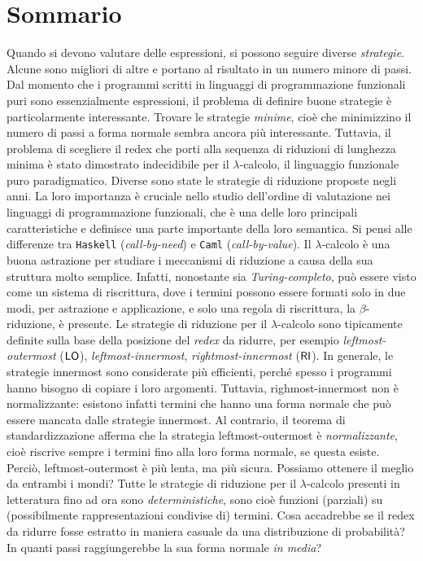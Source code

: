 \chapter*{Sommario}
Quando si devono valutare delle espressioni, si possono seguire diverse \emph{strategie}.
Alcune sono migliori di altre e portano al risultato in un numero
minore di passi. Dal momento che i programmi scritti in linguaggi di
programmazione funzionali puri sono essenzialmente espressioni, il problema
di definire buone strategie è particolarmente interessante. Trovare le
strategie \emph{minime}, cioè che minimizzino il numero di passi a forma
normale sembra ancora più interessante. Tuttavia, il problema di scegliere il
redex che porti alla sequenza di riduzioni di lunghezza minima è stato dimostrato
indecidibile per il $\lambda$-calcolo, il
linguaggio funzionale puro paradigmatico. Diverse sono state le strategie di riduzione proposte
negli anni. La loro importanza è cruciale nello studio dell'ordine di valutazione
nei linguaggi di programmazione funzionali, che è una delle loro principali
caratteristiche e definisce una parte importante della loro semantica.
Si pensi alle differenze tra
\texttt{Haskell} (\emph{call-by-need}) e \texttt{Caml}
(\emph{call-by-value}). Il $\lambda$-calcolo è una buona astrazione per
studiare i meccanismi di riduzione a causa della sua struttura molto
semplice. Infatti, nonostante sia \emph{Turing-completo}, può essere visto
come un sistema di riscrittura, dove i termini
possono essere formati solo in due modi, per astrazione e applicazione, e
solo una regola di riscrittura, la $\beta$-riduzione, è presente. Le strategie
di riduzione per il $\lambda$-calcolo sono tipicamente definite sulla base della
posizione del \emph{redex} da ridurre, per esempio \emph{leftmost-outermost} ($\textsf{LO}$),
\emph{leftmost-innermost}, \emph{rightmost-innermost} ($\textsf{RI}$).
In generale, le strategie innermost sono considerate più efficienti, perché
spesso i programmi hanno bisogno di copiare i loro argomenti. Tuttavia,
righmost-innermost non è normalizzante: esistono infatti termini che hanno
una forma normale che può essere mancata dalle strategie innermost. Al 
contrario, il teorema di standardizzazione afferma che la strategia leftmost-outermost è
\emph{normalizzante}, cioè riscrive sempre i termini fino alla loro forma normale,
se questa esiste. Perciò, leftmost-outermost è più lenta, ma più sicura.
Possiamo ottenere il meglio da entrambi i mondi?  Tutte le strategie di 
riduzione per il $\lambda$-calcolo presenti in letteratura fino ad ora sono
\emph{deterministiche}, sono cioè funzioni (parziali) su
(possibilmente rappresentazioni condivise di) termini. Cosa accadrebbe se il redex da ridurre fosse estratto in maniera casuale da una
distribuzione di probabilità? In quanti passi raggiungerebbe la sua forma
normale \emph{in media}?

